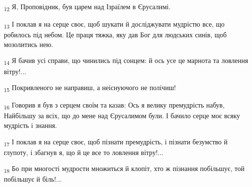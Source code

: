 \begin{tcolorbox}
\textsubscript{12} Я, Проповідник, був царем над Ізраїлем в Єрусалимі.
\end{tcolorbox}
\begin{tcolorbox}
\textsubscript{13} І поклав я на серце своє, щоб шукати й досліджувати мудрістю все, що робилось під небом. Це праця тяжка, яку дав Бог для людських синів, щоб мозолитись нею.
\end{tcolorbox}
\begin{tcolorbox}
\textsubscript{14} Я бачив усі справи, що чинились під сонцем: й ось усе це марнота та ловлення вітру!...
\end{tcolorbox}
\begin{tcolorbox}
\textsubscript{15} Покривленого не направиш, а неіснуючого не полічиш!
\end{tcolorbox}
\begin{tcolorbox}
\textsubscript{16} Говорив я був з серцем своїм та казав: Ось я велику премудрість набув, Найбільшу за всіх, що до мене над Єрусалимом були. І бачило серце моє всяку мудрість і знання.
\end{tcolorbox}
\begin{tcolorbox}
\textsubscript{17} І поклав я на серце своє, щоб пізнати премудрість, і пізнати безумство й глупоту, і збагнув я, що й це все то ловлення вітру!...
\end{tcolorbox}
\begin{tcolorbox}
\textsubscript{18} Бо при многості мудрости множиться й клопіт, хто ж пізнання побільшує, той побільшує й біль!...
\end{tcolorbox}
